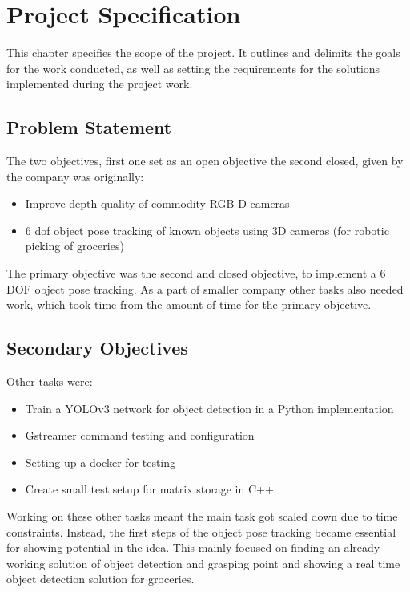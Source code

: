 \chapter{Project Specification}\label{ch:projecspec}\glsresetall
This chapter specifies the scope of the project. It outlines and delimits the goals for the work conducted, as well as setting the requirements for the solutions implemented during the project work. \\

\section{Problem Statement}
The two objectives, first one set as an open objective the second closed, given by the company was originally:
\begin{itemize}
	\item Improve depth quality of commodity RGB-D cameras
	\item 6 \gls{dof} object pose tracking of known objects using 3D cameras (for robotic picking of groceries)
\end{itemize}

The primary objective was the second and closed objective, to implement a 6 DOF object pose tracking.
As a part of smaller company other tasks also needed work, which took time from the amount of time for the primary objective. 

\section{Secondary Objectives}
Other tasks were:
\begin{itemize}
	\item Train a YOLOv3 network for object detection in a Python implementation
	\item Gstreamer command testing and configuration
	\item Setting up a docker for testing
	\item Create small test setup for matrix storage in C++
\end{itemize}

Working on these other tasks meant the main task got scaled down due to time constraints. Instead, the first steps of the object pose tracking became essential for showing potential in the idea. This mainly focused on finding an already working solution of object detection and grasping point and showing a real time object detection solution for groceries.

